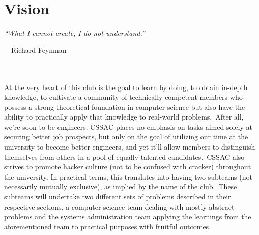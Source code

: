 \documentclass[a4paper,11pt,twocolumn,oneside]{book}
\begin{document}
    \section{Vision}\label{sec:vision}
    \emph{``What I cannot create, I do not understand.''}{\par\hfill\small{---Richard Feynman}}
    \\\\
    At the very heart of this club is the goal to learn by doing, to obtain in-depth knowledge, to cultivate a community
    of technically competent members who possess a strong theoretical foundation in computer science but also have the
    ability to practically apply that knowledge to real-world problems.\ After all, we're soon to be engineers.
    CSSAC places no emphasis on tasks aimed solely at securing better job prospects, but only on the goal of
    utilizing our time at the university to become better engineers, and yet it'll allow members to distinguish
    themselves from others in a pool of equally talented candidates.\ CSSAC also strives to promote
    \href{https://wikipedia.org/wiki/Hacker_culture}{\color{blue}hacker culture} (not to be confused with
    cracker) throughout the university.
    In practical terms, this translates into having two subteams (not necessarily mutually exclusive), as implied by the
    name of the club.\ These subteams will undertake two different sets of problems described in their respective
    sections, a computer science team dealing with mostly abstract problems and the systems administration team applying
    the learnings from the aforementioned team to practical purposes with fruitful outcomes.


\end{document}
